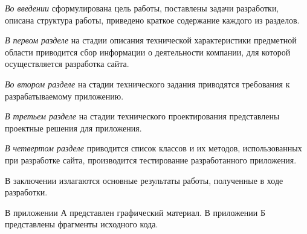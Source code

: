 \emph{Во введении} сформулирована цель работы, поставлены задачи разработки, описана структура работы, приведено краткое содержание каждого из разделов.

\emph{В первом разделе} на стадии описания технической характеристики предметной области приводится сбор информации о деятельности компании, для которой осуществляется разработка сайта.

\emph{Во втором разделе} на стадии технического задания приводятся требования к разрабатываемому приложению.

\emph{В третьем разделе} на стадии технического проектирования представлены проектные решения для приложения.

\emph{В четвертом разделе} приводится список классов и их методов, использованных при разработке сайта, производится тестирование разработанного приложения.

В заключении излагаются основные результаты работы, полученные в ходе разработки.

В приложении А представлен графический материал.
В приложении Б представлены фрагменты исходного кода. 
